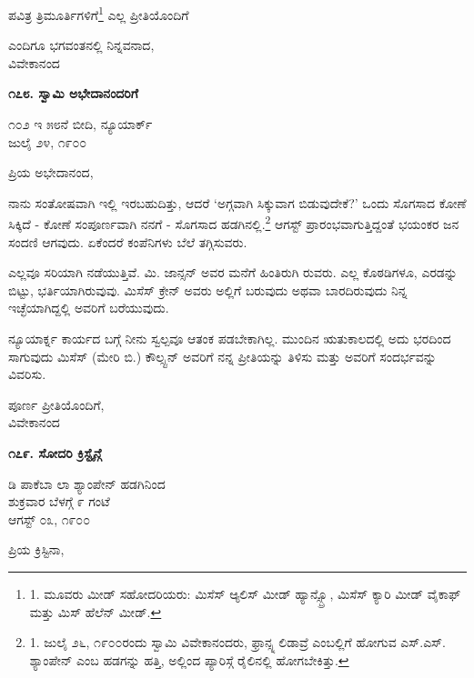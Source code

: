ಪವಿತ್ರ ತ್ರಿಮೂರ್ತಿಗಳಿಗೆ\footnote{1. ಮೂವರು ಮೀಡ್ ಸಹೋದರಿಯರು: ಮಿಸೆಸ್ ಆ್ಯಲಿಸ್ ಮೀಡ್ ಹ್ಯಾನ್ಸ್ಬ್ರೊ, ಮಿಸೆಸ್ ಕ್ಯಾರಿ ಮೀಡ್ ವೈಕಾಫ್ ಮತ್ತು ಮಿಸ್ ಹೆಲೆನ್ ಮೀಡ್.} ಎಲ್ಲ ಪ್ರೀತಿಯೊಂದಿಗೆ

\begin{flushright}
ಎಂದಿಗೂ ಭಗವಂತನಲ್ಲಿ ನಿನ್ನವನಾದ,\\ವಿವೇಕಾನಂದ
\end{flushright}

\begin{center}
\textbf{೧೭೮. ಸ್ವಾಮಿ ಅಭೇದಾನಂದರಿಗೆ}
\end{center}

\begin{flushright}
೧೦೨ ಇ ೫೮ನೆ ಬೀದಿ, ನ್ಯೂಯಾರ್ಕ್\\ಜುಲೈ ೨೪, ೧೯೦೦
\end{flushright}

ಪ್ರಿಯ ಅಭೇದಾನಂದ,

ನಾನು ಸಂತೋಷವಾಗಿ ಇಲ್ಲಿ ಇರಬಹುದಿತ್ತು, ಆದರೆ ‘ಅಗ್ಗವಾಗಿ ಸಿಕ್ಕುವಾಗ ಬಿಡುವುದೇಕೆ?’ ಒಂದು ಸೊಗಸಾದ ಕೋಣೆ ಸಿಕ್ಕಿದೆ - ಕೋಣೆ ಸಂಪೂರ್ಣವಾಗಿ ನನಗೆ - ಸೊಗಸಾದ ಹಡಗಿನಲ್ಲಿ.\footnote{1. ಜುಲೈ ೨೬, ೧೯೦೦ರಂದು ಸ್ವಾಮಿ ವಿವೇಕಾನಂದರು, ಫ್ರಾನ್ಸ್ನ ಲಿಡಾವ್ರೆ ಎಂಬಲ್ಲಿಗೆ ಹೋಗುವ ಎಸ್.ಎಸ್. ಶ್ಯಾಂಪೇನ್ ಎಂಬ ಹಡಗನ್ನು ಹತ್ತಿ, ಅಲ್ಲಿಂದ ಪ್ಯಾರಿಸ್ಗೆ ರೈಲಿನಲ್ಲಿ ಹೋಗಬೇಕಿತ್ತು.} ಆಗಸ್ಟ್ ಪ್ರಾರಂಭವಾಗುತ್ತಿದ್ದಂತೆ ಭಯಂಕರ ಜನ ಸಂದಣಿ ಆಗವುದು. ಏಕೆಂದರೆ ಕಂಪೆನಿಗಳು ಬೆಲೆ ತಗ್ಗಿಸುವರು.

ಎಲ್ಲವೂ ಸರಿಯಾಗಿ ನಡೆಯುತ್ತಿವೆ. ಮಿ. ಜಾನ್ಸನ್ ಅವರ ಮನೆಗೆ ಹಿಂತಿರುಗಿ ರುವರು. ಎಲ್ಲ ಕೊಠಡಿಗಳೂ, ಎರಡನ್ನು ಬಿಟ್ಟು, ಭರ್ತಿಯಾಗಿರುವುವು. ಮಿಸೆಸ್ ಕ್ರೇನ್ ಅವರು ಅಲ್ಲಿಗೆ ಬರುವುದು ಅಥವಾ ಬಾರದಿರುವುದು ನಿನ್ನ ಇಚ್ಛೆಯಾಗಿದ್ದಲ್ಲಿ ಅವರಿಗೆ ಬರೆಯುವುದು.

ನ್ಯೂಯಾರ್ಕ್ನ ಕಾರ್ಯದ ಬಗ್ಗೆ ನೀನು ಸ್ವಲ್ಪವೂ ಆತಂಕ ಪಡಬೇಕಾಗಿಲ್ಲ. ಮುಂದಿನ ಋತುಕಾಲದಲ್ಲಿ ಅದು ಭರದಿಂದ ಸಾಗುವುದು ಮಿಸೆಸ್ (ಮೇರಿ ಬಿ.) ಕೌಲ್ಸ್ಟನ್ ಅವರಿಗೆ ನನ್ನ ಪ್ರೀತಿಯನ್ನು ತಿಳಿಸು ಮತ್ತು ಅವರಿಗೆ ಸಂದರ್ಭವನ್ನು ವಿವರಿಸು.

\begin{flushright}
ಪೂರ್ಣ ಪ್ರೀತಿಯೊಂದಿಗೆ,\\ವಿವೇಕಾನಂದ
\end{flushright}

\begin{center}
\textbf{೧೭೯. ಸೋದರಿ ಕ್ರಿಸ್ಟೈನ್ಗೆ}
\end{center}

\begin{flushright}
ಡಿ ಪಾಕೆಬಾ ಲಾ ಶ್ಯಾಂಪೇನ್ ಹಡಗಿನಿಂದ\\ಶುಕ್ರವಾರ ಬೆಳಗ್ಗೆ ೯ ಗಂಟೆ\\ಆಗಸ್ಟ್ ೦೩, ೧೯೦೦
\end{flushright}

ಪ್ರಿಯ ಕ್ರಿಸ್ಟಿನಾ,

